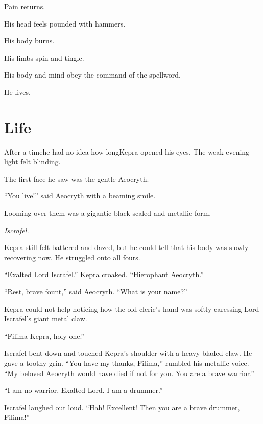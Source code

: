 \documentclass
  [a4paper,
   12pt,
   oneside
  ]%
  {article}
\newcommand{\sectionbreak}{\bigskip\noindent}
\begin{document}
Pain returns. 

His head feels pounded with hammers. 

His body burns. 

His limbs spin and tingle. %

His body and mind obey the command of the spellword. 

He lives.



\section{Life}

After a time\dash{}he had no idea how long\dash{}Kepra opened his eyes. 
The weak evening light felt blinding. 

The first face he saw was the gentle Aeocryth. 

``You live!'' said Aeocryth with a beaming smile. 

Looming over them was a gigantic black-scaled and metallic form.

\emph{Iscrafel.}



Kepra still felt battered and dazed, but he could tell that his body was slowly recovering now. 
He struggled onto all fours. 

``Exalted Lord Iscrafel.'' Kepra croaked. ``Hierophant Aeocryth.''

``Rest, brave fount,'' said Aeocryth. ``What is your name?''

Kepra could not help noticing how the old cleric's hand was softly caressing Lord Iscrafel’s giant metal claw.

``Filima Kepra, holy one.'' 

Iscrafel bent down and touched Kepra's shoulder with a heavy bladed claw. 
He gave a toothy grin.
``You have my thanks, Filima,'' rumbled his metallic voice. ``My beloved Aeocryth would have died if not for you. You are a brave warrior.'' 

``I am no warrior, Exalted Lord. I am a drummer.''

Iscrafel laughed out loud. ``Hah! Excellent! Then you are a brave drummer, Filima!'' 
\end{document}
